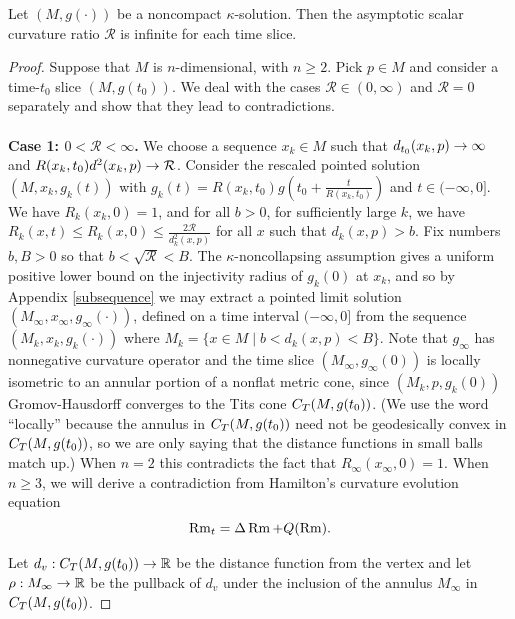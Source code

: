 \begin{theorem}
  \label{thm:kl-asymptotic-scalar-curvature-asymptotic-volume-ratio-compactness-kappa-solutions}
 \label{asympscalar}
Let $(M,g(\cdot))$ be a noncompact $\kappa$-solution.
Then the asymptotic scalar curvature ratio ${\mathcal R}$
is infinite for each time slice.
\end{theorem}
\begin{proof}
Suppose that $M$ is $n$-dimensional,
with $n\geq 2$.   Pick $p\in M$ and consider a time-$t_0$
slice $(M,g(t_0))$.
We deal with the cases ${\mathcal R} \in (0, \infty)$ and
${\mathcal R} = 0$ separately and show that they lead to contradictions. \\ \\
{\bf Case 1: $0<{\mathcal R}<\infty$.}  We choose a sequence
$x_k\in M$ such that $d_{t_0}(x_k,p)\rightarrow \infty$ and
$R(x_k,t_0)d^2(x_k,p)\rightarrow{\mathcal R}$.
Consider the rescaled pointed solution
$(M,x_k,g_k(t))$ with
$g_k(t) =R(x_k,t_0)g(t_0 + \frac{t}{R(x_k,t_0)})$ and $t\in (-\infty,0]$.
We have $R_k(x_k,0)=1$, and for all $b>0$, for sufficiently large $k$,
we have $R_k(x,t)\leq R_k(x,0)\leq \frac{2{\mathcal R}}{d_k^2(x,p)}$
for all $x$ such that $d_k(x,p)>b$.
Fix numbers $b, B > 0$ so that  $b<\sqrt{{\mathcal R}}<B$.
The $\kappa$-noncollapsing assumption gives a uniform positive
lower bound on the
injectivity radius of $g_k(0)$ at $x_k$,
and so by Appendix \ref{subsequence}
we may extract a pointed limit solution
$(M_\infty,x_\infty,g_\infty(\cdot))$, defined on a time interval
$(-\infty,0]$ from the sequence
$(M_k,x_k,g_k(\cdot))$ where $M_k =\{x\in M\mid b<d_k(x,p)<B\}$.
Note that $g_\infty$ has nonnegative curvature operator and
the time slice $(M_\infty,g_\infty(0))$ is locally
isometric to an annular
portion of a nonflat metric cone, since $(M_k,p,g_k(0))$
Gromov-Hausdorff converges to the Tits cone $C_T(M,g(t_0))$.
(We use the word ``locally'' because the annulus in $C_T(M,g(t_0))$
need not be geodesically convex in $C_T(M,g(t_0))$, so we are only
saying that the distance functions in small balls match up.)
When $n=2$ this contradicts the fact that $R_\infty(x_\infty,0)=1$.
When $n\geq 3$, we will derive a contradiction from
Hamilton's curvature evolution equation
\begin{equation}
\label{curvevol}
\operatorname{Rm}_t=\Delta \operatorname{Rm}+Q(\operatorname{Rm}).
\end{equation}

Let $d_v : C_T(M,g(t_0)) \rightarrow {\mathbb R}$ be the distance function
from the vertex and let
$\rho:M_\infty\rightarrow {\mathbb R}$ be the pullback of $d_v$ under the inclusion of
the annulus $M_\infty$ in $C_T(M,g(t_0))$.

\end{proof}
